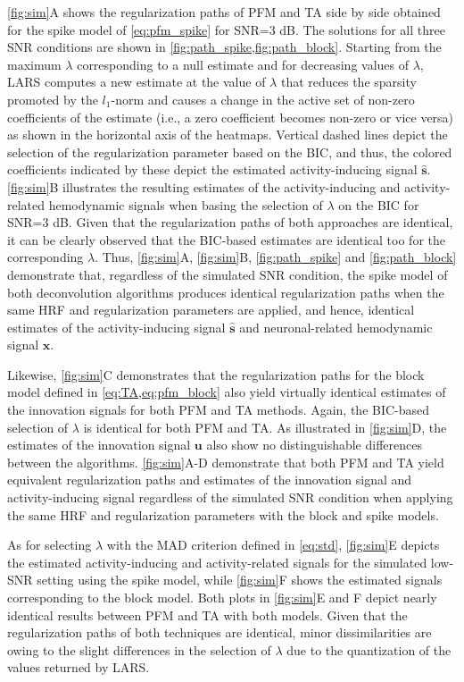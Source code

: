 \cref{fig:sim}A shows the regularization paths of PFM and TA side by side
obtained for the spike model of \cref{eq:pfm_spike} for SNR=3 dB. The solutions
for all three SNR conditions are shown in \cref{fig:path_spike,fig:path_block}.
Starting from the maximum $\lambda$ corresponding to a null estimate and for
decreasing values of $\lambda$, LARS computes a new estimate at the value of
$\lambda$ that reduces the sparsity promoted by the \(l_1\)-norm and causes a
change in the active set of non-zero coefficients of the estimate (i.e., a zero
coefficient becomes non-zero or vice versa) as shown in the horizontal axis of
the heatmaps. Vertical dashed lines depict the selection of the regularization
parameter based on the BIC, and thus, the colored coefficients indicated by
these depict the estimated activity-inducing signal $\mathbf{\hat{{s}}}$.
\cref{fig:sim}B illustrates the resulting estimates of the activity-inducing and
activity-related hemodynamic signals when basing the selection of $\lambda$ on
the BIC for SNR=3 dB. Given that the regularization paths of both approaches are
identical, it can be clearly observed that the BIC-based estimates are identical
too for the corresponding $\lambda$. Thus, \cref{fig:sim}A, \cref{fig:sim}B,
\cref{fig:path_spike} and \cref{fig:path_block} demonstrate that, regardless of
the simulated SNR condition, the spike model of both deconvolution algorithms
produces identical regularization paths when the same HRF and regularization
parameters are applied, and hence, identical estimates of the activity-inducing
signal $\mathbf{\hat{{s}}}$ and neuronal-related hemodynamic signal
$\mathbf{\hat{{x}}}$. 

Likewise, \cref{fig:sim}C demonstrates that the regularization paths for the
block model defined in \cref{eq:TA,eq:pfm_block} also yield virtually identical
estimates of the innovation signals for both PFM and TA methods. Again, the
BIC-based selection of $\lambda$ is identical for both PFM and TA. As
illustrated in \cref{fig:sim}D, the estimates of the innovation signal
$\mathbf{u}$ also show no distinguishable differences between the algorithms.
\cref{fig:sim}A-D demonstrate that both PFM and TA yield equivalent
regularization paths and estimates of the innovation signal and
activity-inducing signal regardless of the simulated SNR condition when applying
the same HRF and regularization parameters with the block and spike models.

As for selecting $\lambda$ with the MAD criterion defined in \cref{eq:std},
\cref{fig:sim}E depicts the estimated activity-inducing and activity-related
signals for the simulated low-SNR setting using the spike model, while
\cref{fig:sim}F shows the estimated signals corresponding to the block model.
Both plots in \cref{fig:sim}E and F depict nearly identical results between PFM
and TA with both models. Given that the regularization paths of both techniques
are identical, minor dissimilarities are owing to the slight differences in the
selection of $\lambda$ due to the quantization of the values returned by LARS.

